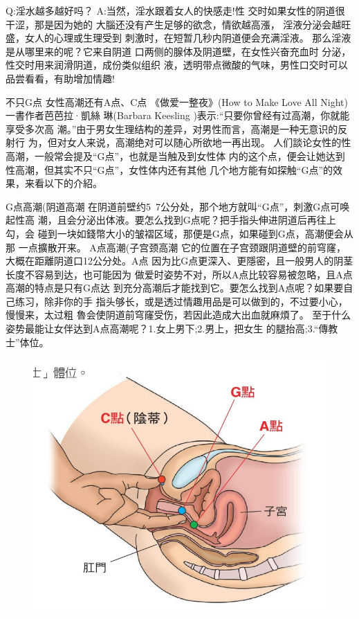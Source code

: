 \documentclass[12pt,UTF8]{ctexbook}
\begin{document}
Q:淫水越多越好吗？
A:当然，淫水跟着女人的快感走!性
交时如果女性的阴道很干涩，那是因为她的
大腦还没有产生足够的欲念，情欲越高漲，
淫液分泌会越旺盛，女人的心理或生理受到
刺激时，在短暂几秒内阴道便会充满淫液。
那么淫液是从哪里来的呢？它来自阴道
口两侧的腺体及阴道壁，在女性兴奋充血时
分泌，性交时用来润滑阴道，成份类似组织
液，透明带点微酸的气味，男性口交时可以
品尝看看，有助增加情趣!

不只G点
女性高潮还有A点、C点
《做爱一整夜》(How to Make Love All Night)一書作者芭芭拉·凱絲
琳(Barbara Keesling )表示:“只要你曾经有过高潮，你就能享受多次高
潮。”由于男女生理结构的差异，对男性而言，高潮是一种无意识的反射行
为，但对女人来说，高潮绝对可以随心所欲地一再出现。
人们談论女性的性高潮，一般常会提及“G点”，也就是当触及到女性体
内的这个点，便会让她达到性高潮，但其实不只“G点”，女性体内还有其他
几个地方能有如探触“G点”的效果，来看以下的介紹。

G点高潮(阴道高潮
在阴道前壁约5~7公分处，那个地方就叫“G点”，刺激G点可唤起性高
潮，且会分泌出体液。要怎么找到G点呢？把手指头伸进阴道后再往上勾，会
碰到一块如錢幣大小的皱褶区域，那便是G点，如果碰到G点，高潮便会从那
一点擴散开来。
A点高潮(子宫颈高潮
它的位置在子宫颈跟阴道壁的前穹窿，大概在距離阴道口12公分处。A点
因为比G点更深入、更隱密，且一般男人的阴茎长度不容易到达，也可能因为
做爱时姿势不对，所以A点比较容易被忽略，且A点高潮的特点是只有G点达
到充分高潮后才能找到它。要怎么找到A点呢？如果要自己练习，除非你的手
指头够长，或是透过情趣用品是可以做到的，不过要小心，慢慢来，太过粗
魯会使阴道前穹窿受伤，若因此造成大出血就麻煩了。
至于什么姿势最能让女伴达到A点高潮呢？1.女上男下;2.男上，把女生
的腿抬高;3.“傳教士”体位。

\begin{figure}[htbp]
	\centering
	\includegraphics[width=0.7\linewidth]{16}
	\caption{}
	\label{fig:1}
\end{figure}
\end{document}
